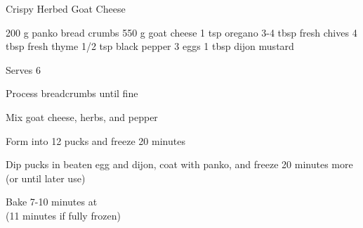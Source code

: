\begin{recipe}{Crispy Herbed Goat Cheese}{}
\begin{ingredients}
200 g panko bread crumbs
550 g goat cheese
1 tsp oregano
3-4 tbsp fresh chives
4 tbsp fresh thyme
1/2 tsp black pepper
3 eggs
1 tbsp dijon mustard
\end{ingredients}
\nextcolumn
Serves 6
\begin{steps}
\item Process breadcrumbs until fine
\item Mix goat cheese, herbs, and pepper
\item Form into 12 pucks and freeze 20 minutes
\item Dip pucks in beaten egg and dijon, coat with panko, and freeze 20 minutes more \\(or until later use)
\item Bake 7-10 minutes at  \\(11 minutes if fully frozen)
\end{steps}
\end{recipe}
